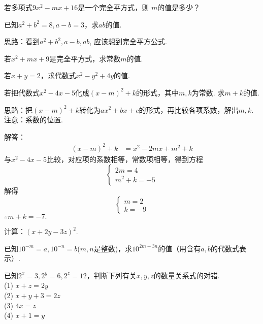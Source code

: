 \item{
    若多项式$ 9x^2 - mx+16$是一个完全平方式，则 $m$的值是多少？
}
\item{
    已知$a^2+b^2=8, a-b=3$，求$ab$的值.

    \fangsong{}
    思路：看到$a^2+b^2, a-b, ab$, 应该想到完全平方公式.
}
\item{
    若$x^2+mx+9$是完全平方式，求常数$m$的值.
}
\item{
    若$x+y=2$，求代数式$x^2-y^2+4y$的值.
}
\item{
    若把代数式$x^2-4x-5$化成$(x-m)^2+k$的形式，其中$m,k$为常数. 求$m+k$的值.

    \fangsong{}
    思路：把$(x-m)^2+k$转化为$ax^2+bx+c$的形式，再比较各项系数，解出$m,k$.\\
    注意：系数的位置.

    解答：
    \begin{align*}
        (x-m)^2+k &= x^2-2mx+m^2+k
    \end{align*}
    与$x^2-4x-5$比较，对应项的系数相等，常数项相等，得到方程
    \[\left\{ 
        \begin{array}{lc}
            2m = 4\\
            m^2+k=-5
        \end{array}
    \right.\]
    解得
    \[\left\{ 
        \begin{array}{lc}
            m = 2\\
            k =-9
        \end{array}
    \right.\]
    $\therefore m+k=-7.$
}
\item{
    计算：$(x+2y-3z)^2$.
}
\item{
    已知$10^{-m}=a, 10^{-n}=b$($m, n$是整数)，求$10^{2m-3n}$的值（用含有$a, b$的代数式表示）.
}
\item{
    已知$2^x=3, 2^y=6, 2^z=12$，判断下列有关$x, y, z$的数量关系式的对错.\\
    (1) $x+z=2y$\\
    (2) $x+y+3=2z$\\
    (3) $4x=z$\\
    (4) $x+1=y$
}
